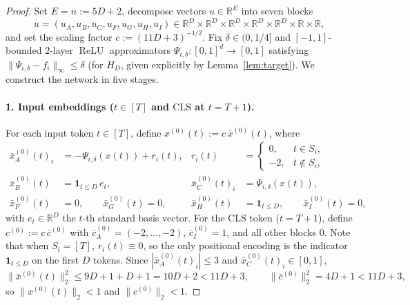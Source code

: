 \documentclass[11pt]{article}
\theoremstyle{plain}
\theoremstyle{definition}
\theoremstyle{remark}
\DeclareMathOperator{\ReLU}{ReLU}
\newcommand{\R}{\mathbb{R}}
\newcommand{\1}{\mathbf{1}}
\newcommand{\CLS}{\mathrm{CLS}}
\begin{document}
\begin{proof}
Set $E = n := 5D + 2$, decompose vectors $u \in \R^E$ into seven blocks
\[
u = (u_A, u_B, u_C, u_F, u_G, u_H, u_I) \in \R^D \times \R^D \times \R^D \times \R^D \times \R^D \times \R \times \R,
\]
and set the scaling factor $c := (11D + 3)^{-1/2}$. Fix $\delta \in (0, 1/4]$ and $[-1,1]$-bounded $2$-layer $\ReLU$ approximators $\Psi_{i,\delta} : [0,1]^d \to [0,1]$ satisfying $\|\Psi_{i,\delta} - f_i\|_\infty \le \delta$ (for $H_D$, given explicitly by Lemma~\ref{lem:target}). We construct the network in five stages.

\paragraph{1. Input embeddings ($t \in [T]$ and $\CLS$ at $t = T+1$).}
For each input token $t \in [T]$, define $x^{(0)}(t) := c\,\bar{x}^{(0)}(t)$, where
\begin{align*}
\bar{x}^{(0)}_A(t)_i &= -\Psi_{i,\delta}(x(t)) + r_i(t),
& r_i(t) &= \begin{cases} 0, & t \in S_i, \\ -2, & t \notin S_i, \end{cases} \\
\bar{x}^{(0)}_B(t) &= \1_{t \le D}\, e_t,
& \bar{x}^{(0)}_C(t)_i &= \Psi_{i,\delta}(x(t)), \\
\bar{x}^{(0)}_F(t) &= 0, \qquad \bar{x}^{(0)}_G(t) = 0,
& \bar{x}^{(0)}_H(t) &= \1_{t \le D}, \qquad \bar{x}^{(0)}_I(t) = 0,
\end{align*}
with $e_t \in \R^D$ the $t$-th standard basis vector. For the $\CLS$ token ($t = T+1$), define $c^{(0)} := c\,\bar{c}^{(0)}$ with $\bar{c}^{(0)}_A = (-2, \dots, -2)$, $\bar{c}^{(0)}_I = 1$, and all other blocks $0$. Note that when $S_i = [T]$, $r_i(t) \equiv 0$, so the only positional encoding is the indicator $\1_{t \le D}$ on the first $D$ tokens. Since $|\bar{x}^{(0)}_A(t)_i| \le 3$ and $\bar{x}^{(0)}_C(t)_i \in [0,1]$,
\[
\bigl\|\bar{x}^{(0)}(t)\bigr\|_2^2 \le 9D + 1 + D + 1 = 10D + 2 < 11D + 3,
\qquad
\bigl\|\bar{c}^{(0)}\bigr\|_2^2 = 4D + 1 < 11D + 3,
\]
so $\|x^{(0)}(t)\|_2 < 1$ and $\|c^{(0)}\|_2 < 1$.


\end{proof}
\end{document}
